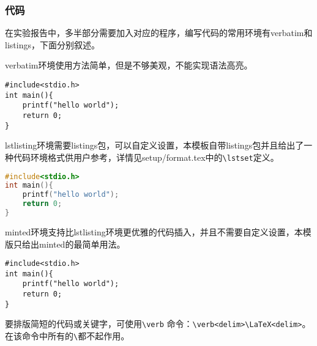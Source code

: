 \subsubsection{代码}
在实验报告中，多半部分需要加入对应的程序，编写代码的常用环境有verbatim和listings，下面分别叙述。

verbatim环境使用方法简单，但是不够美观，不能实现语法高亮。
\begin{verbatim}
#include<stdio.h>
int main(){
	printf("hello world");
	return 0;
}
\end{verbatim}

lstlisting环境需要listings包，可以自定义设置，本模板自带listings包并且给出了一种代码环境格式供用户参考，详情见setup/format.tex中的\verb|\lstset|定义。

\begin{lstlisting}[language=C]
#include<stdio.h>
int main(){
	printf("hello world");
	return 0;
}
\end{lstlisting}

minted环境支持比lstlisting环境更优雅的代码插入，并且不需要自定义设置，本模版只给出minted的最简单用法。

\begin{verbatim}
#include<stdio.h>
int main(){
    printf("hello world");
    return 0;
}
\end{verbatim}

要排版简短的代码或关键字，可使用\verb|\verb| 命令：\verb|\verb<delim>\LaTeX<delim>|。
在该命令中所有的\verb|\|都不起作用。